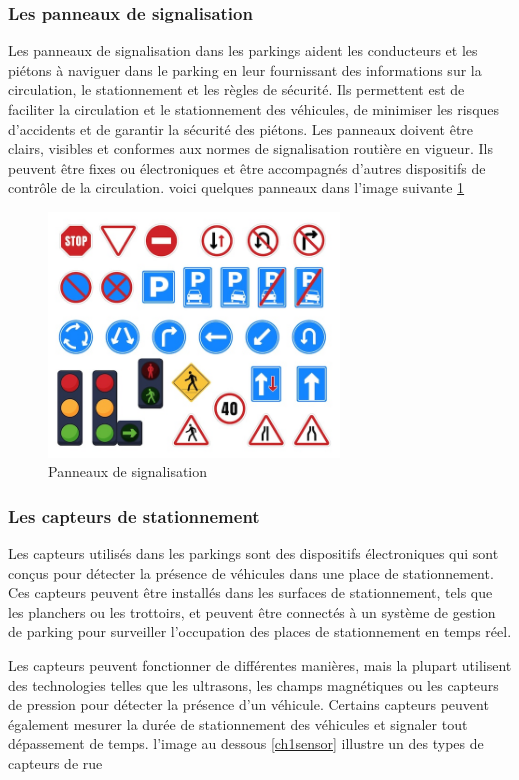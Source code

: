 \subsubsection{ Les panneaux de signalisation}
Les panneaux de signalisation dans les parkings aident les conducteurs et les piétons à naviguer dans le parking en leur fournissant des informations sur la circulation, le stationnement et les règles de sécurité. Ils permettent est de faciliter la circulation et le stationnement des véhicules, de minimiser les risques d'accidents et de garantir la sécurité des piétons. Les panneaux doivent être clairs, visibles et conformes aux normes de signalisation routière en vigueur. Ils peuvent être fixes ou électroniques et être accompagnés d'autres dispositifs de contrôle de la circulation.
voici quelques panneaux dans l'image suivante \ref{ch1plak}

\begin{figure}[H]
	\centering
	\includegraphics[height=06.5cm]{img/ch1-plak-01.jpg}
	\caption{Panneaux de signalisation}
 \label{ch1plak}
\end{figure}


\subsubsection{Les capteurs de stationnement}
Les capteurs utilisés dans les parkings sont des dispositifs électroniques qui sont conçus pour détecter la présence de véhicules dans une place de stationnement. Ces capteurs peuvent être installés dans les surfaces de stationnement, tels que les planchers ou les trottoirs, et peuvent être connectés à un système de gestion de parking pour surveiller l'occupation des places de stationnement en temps réel.

Les capteurs peuvent fonctionner de différentes manières, mais la plupart utilisent des technologies telles que les ultrasons, les champs magnétiques ou les capteurs de pression pour détecter la présence d'un véhicule. Certains capteurs peuvent également mesurer la durée de stationnement des véhicules et signaler tout dépassement de temps. l'image au dessous \ref{ch1sensor} illustre un des types de capteurs de rue 

